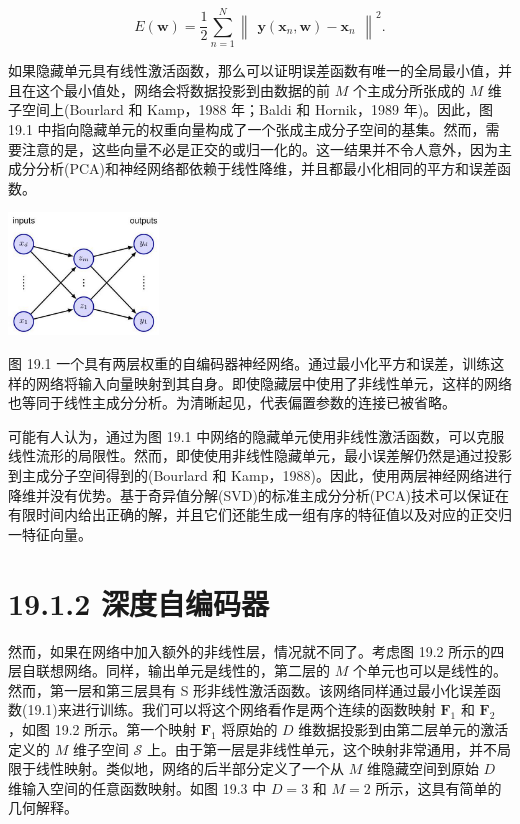 \documentclass[10pt]{report}
\begin{document}
\[
E\left( \mathbf{w}\right)  = \frac{1}{2}\mathop{\sum }\limits_{{n = 1}}^{N}{\begin{Vmatrix}\mathbf{y}\left( {\mathbf{x}}_{n},\mathbf{w}\right)  - {\mathbf{x}}_{n}\end{Vmatrix}}^{2}. \tag{19.1}
\]

如果隐藏单元具有线性激活函数，那么可以证明误差函数有唯一的全局最小值，并且在这个最小值处，网络会将数据投影到由数据的前 \(M\) 个主成分所张成的 \(M\) 维子空间上(Bourlard 和 Kamp，1988 年；Baldi 和 Hornik，1989 年)。因此，图 19.1 中指向隐藏单元的权重向量构成了一个张成主成分子空间的基集。然而，需要注意的是，这些向量不必是正交的或归一化的。这一结果并不令人意外，因为主成分分析(PCA)和神经网络都依赖于线性降维，并且都最小化相同的平方和误差函数。

\begin{center}
\includegraphics[max width=0.3\textwidth]{images/0194e279-9b28-703a-88f4-c3ac21e2010d_584_1053_351_486_396_0.jpg}
\end{center}
\hspace*{3em} 

图 19.1 一个具有两层权重的自编码器神经网络。通过最小化平方和误差，训练这样的网络将输入向量映射到其自身。即使隐藏层中使用了非线性单元，这样的网络也等同于线性主成分分析。为清晰起见，代表偏置参数的连接已被省略。

可能有人认为，通过为图 19.1 中网络的隐藏单元使用非线性激活函数，可以克服线性流形的局限性。然而，即使使用非线性隐藏单元，最小误差解仍然是通过投影到主成分子空间得到的(Bourlard 和 Kamp，1988)。因此，使用两层神经网络进行降维并没有优势。基于奇异值分解(SVD)的标准主成分分析(PCA)技术可以保证在有限时间内给出正确的解，并且它们还能生成一组有序的特征值以及对应的正交归一特征向量。

\section*{19.1.2 深度自编码器}

然而，如果在网络中加入额外的非线性层，情况就不同了。考虑图 19.2 所示的四层自联想网络。同样，输出单元是线性的，第二层的 \(M\) 个单元也可以是线性的。然而，第一层和第三层具有 S 形非线性激活函数。该网络同样通过最小化误差函数(19.1)来进行训练。我们可以将这个网络看作是两个连续的函数映射 \({\mathbf{F}}_{1}\) 和 \({\mathbf{F}}_{2}\) ，如图 19.2 所示。第一个映射 \({\mathbf{F}}_{1}\) 将原始的 \(D\) 维数据投影到由第二层单元的激活定义的 \(M\) 维子空间 \(\mathcal{S}\) 上。由于第一层是非线性单元，这个映射非常通用，并不局限于线性映射。类似地，网络的后半部分定义了一个从 \(M\) 维隐藏空间到原始 \(D\) 维输入空间的任意函数映射。如图 19.3 中 \(D = 3\) 和 \(M = 2\) 所示，这具有简单的几何解释。
\end{document}
